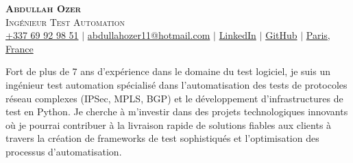 \documentclass[letterpaper,10pt]{article}
\begin{document}



\begin{center}
    \textbf{\Huge \scshape Abdullah Ozer} \\ \vspace{5pt}
    {\LARGE \scshape Ingénieur Test Automation} \\ \vspace{3pt}
    \small
    \faMobile \hspace{.5pt} \href{tel:33769929851}{+337 69 92 98 51}
    $|$
    \faAt \hspace{.5pt} \href{
      mailto:abdullahozer11@hotmail.com
    }{abdullahozer11@hotmail.com}
    $|$
    \faLinkedinSquare \hspace{.5pt} \href{
      https://www.linkedin.com/in/abdullah-ozer-a23733107/?locale=fr
    }{LinkedIn}
    $|$
    \faGithub \hspace{.5pt} \href{https://github.com/abdullahozer11}{GitHub}
    $|$
    \faMapMarker \hspace{.5pt} \href{
      https://www.google.com/maps/place/Paris/@48.8588255,2.2646353,12z/data=!3m1!4b1!4m6!3m5!1s0x47e66e1f06e2b70f:0x40b82c3688c9460!8m2!3d48.856614!4d2.3522219!16zL20vMDVxdGo?entry=ttu
    }{Paris, France}

\raggedright
    \vspace{10pt}
    Fort de plus de 7 ans d'expérience dans le domaine du test logiciel, je suis un ingénieur test
    automation spécialisé dans l'automatisation des tests de protocoles réseau complexes (IPSec,
    MPLS, BGP) et le développement d'infrastructures de test en Python. Je cherche à m'investir dans
    des projets technologiques innovants où je pourrai contribuer à la livraison rapide de solutions
    fiables aux clients à travers la création de frameworks de test sophistiqués et l'optimisation
    des processus d'automatisation.
\end{center}
\end{document}
